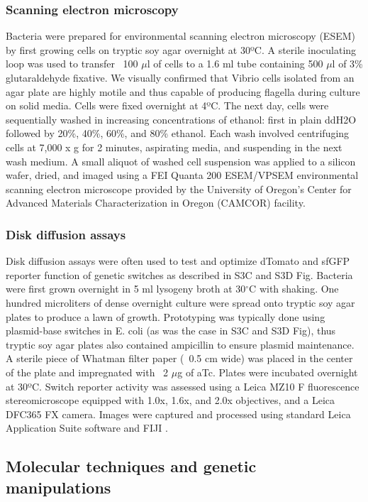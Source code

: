 \subsubsection{Scanning electron microscopy} 
Bacteria were prepared for environmental scanning electron microscopy (ESEM) by first growing cells on tryptic soy agar overnight at 30ºC. A sterile inoculating loop was used to transfer ~100 $\mu$l of cells to a 1.6 ml tube containing 500 $\mu$l of 3\% glutaraldehyde fixative. We visually confirmed that Vibrio cells isolated from an agar plate are highly motile and thus capable of producing flagella during culture on solid media. Cells were fixed overnight at 4ºC. The next day, cells were sequentially washed in increasing concentrations of ethanol: first in plain ddH2O followed by 20\%, 40\%, 60\%, and 80\% ethanol. Each wash involved centrifuging cells at 7,000 x g for 2 minutes, aspirating media, and suspending in the next wash medium. A small aliquot of washed cell suspension was applied to a silicon wafer, dried, and imaged using a FEI Quanta 200 ESEM/VPSEM environmental scanning electron microscope provided by the University of Oregon's Center for Advanced Materials Characterization in Oregon (CAMCOR) facility. 

\subsubsection{Disk diffusion assays}
Disk diffusion assays were often used to test and optimize dTomato and sfGFP reporter function of genetic switches as described in S3C and S3D Fig. Bacteria were first grown overnight in 5 ml lysogeny broth at 30$^\circ$C with shaking. One hundred microliters of dense overnight culture were spread onto tryptic soy agar plates to produce a lawn of growth. Prototyping was typically done using plasmid-base switches in E. coli (as was the case in S3C and S3D Fig), thus tryptic soy agar plates also contained ampicillin to ensure plasmid maintenance. A sterile piece of Whatman filter paper (~0.5 cm wide) was placed in the center of the plate and impregnated with ~2 $\mu$g of aTc. Plates were incubated overnight at 30ºC. Switch reporter activity was assessed using a Leica MZ10 F fluorescence stereomicroscope equipped with 1.0x, 1.6x, and 2.0x objectives, and a Leica DFC365 FX camera. Images were captured and processed using standard Leica Application Suite software and FIJI \cite{schindelin_fiji_2012}.   

\subsection{Molecular techniques and genetic manipulations}

